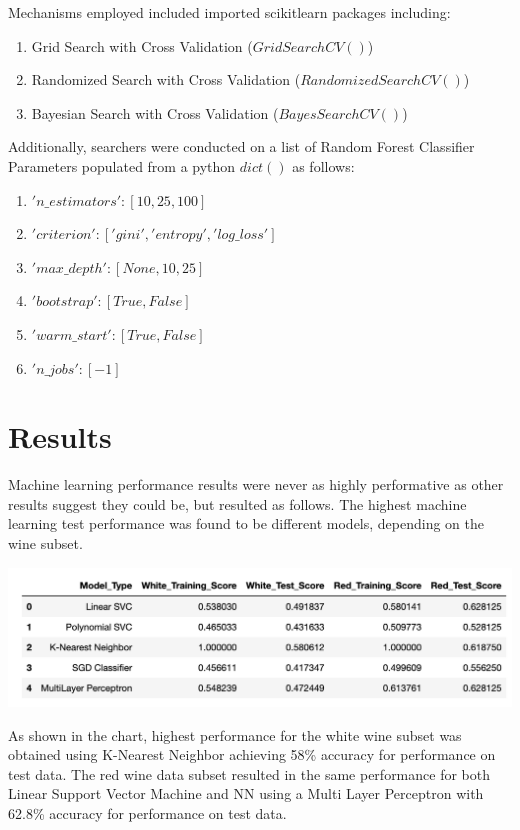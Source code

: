 \documentclass[titlepage]{article}
\begin{document}
		Mechanisms employed included imported scikitlearn packages including:  
	
	\begin{enumerate}
		\item Grid Search with Cross Validation ($GridSearchCV()$)
		\item Randomized Search with Cross Validation ($RandomizedSearchCV()$)
		\item Bayesian Search with Cross Validation ($BayesSearchCV()$)
	\end{enumerate}
	
	Additionally, searchers were conducted on a list of Random Forest Classifier Parameters populated from a python $dict()$ as follows:  
		 
	 \begin{enumerate} 		
	 	\item $'n\_estimators': [10, 25, 100]$
		\item $'criterion': ['gini', 'entropy', 'log\_loss']$
		\item $'max\_depth': [None, 10, 25]$
	 	\item $'bootstrap': [True, False]$
	 	\item $'warm\_start': [True, False]$
	 	\item $'n\_jobs': [-1]$
	 \end{enumerate}
	 
	\section*{Results}
	Machine learning performance results were never as highly performative as other results suggest they could be, but resulted as follows.  The highest machine learning test performance was found to be different models, depending on the wine subset.  
	\begin{center}
		 \includegraphics[width=.5\textwidth]{img/results.png}
	\end{center}
	
As shown in the chart, highest performance for the white wine subset was obtained using K-Nearest Neighbor achieving 58\% accuracy for performance on test data.  The red wine data subset resulted in the same performance for both Linear Support Vector Machine and NN using a Multi Layer Perceptron with 62.8\% accuracy for performance on test data.
	
\end{document}
